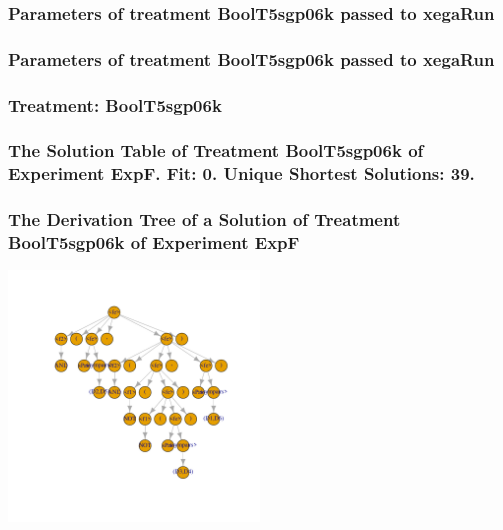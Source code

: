 \documentclass[18pt,c]{beamer}
\begin{document}

 \begin{frame}
 \fontsize{8pt}{9pt}\selectfont
 \frametitle{  Parameters of treatment BoolT5sgp06k passed to xegaRun
 }

 \label{ExpFtParmTable018.tex}  
 \end{frame}


 \begin{frame}
 \fontsize{8pt}{9pt}\selectfont
 \frametitle{  Parameters of treatment BoolT5sgp06k passed to xegaRun
 }

 \label{ExpFtParmTable019.tex}  
 \end{frame}

 \begin{frame}
 \fontsize{8pt}{9pt}\selectfont
 \frametitle{ Treatment: BoolT5sgp06k }

 \label{ExpFStatsTable010.tex}  
 \end{frame}

 \begin{frame}
 \fontsize{8pt}{9pt}\selectfont
 \frametitle{ The Solution Table of Treatment BoolT5sgp06k of Experiment ExpF. Fit: 0. Unique Shortest Solutions: 39. }

 \label{ExpFSolutionTable004.tex}  
 \end{frame}

 \begin{frame}
 \frametitle{ The Derivation Tree of a Solution of Treatment BoolT5sgp06k of Experiment ExpF }
 \begin{center}
\includegraphics[width=0.5\textwidth, angle=0]
{ExpFDerivationTreeFigure004.pdf}
 \end{center}
 \label{report/ExpFDerivationTreeFigure004.pdf}  
 \end{frame}
\end{document}
